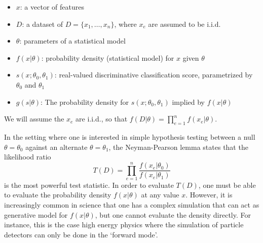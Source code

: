 \documentclass[11pt, oneside]{article}   	%
\begin{document}
\begin{itemize}
 \item $x$: a vector of features
 \item $D$: a dataset of $D=\{x_1, \dots, x_n\}$, where $x_e$ are assumed to be i.i.d.
 \item $\theta$: parameters of a statistical model
\item $f(x| \theta)$:  probability density  (statistical model) for $x$ given $\theta$
\item $s(x;\theta_0, \theta_1)$: real-valued discriminative classification score, parametrized by $\theta_0$ and $\theta_1$
\item $g( s | \theta )$: The probability density  for $s(x; \theta_0, \theta_1)$ implied by $f(x|\theta)$ \end{itemize}
We will assume the $x_e$ are i.i.d., so that $f(D|\theta) = \prod_{e=1}^n f(x_e | \theta)$.

\newpage

In the setting where one is interested in simple hypothesis testing between a null $\theta=\theta_0$ against an alternate $\theta=\theta_1$, the Neyman-Pearson lemma states that the likelihood ratio 
\begin{equation}
T(D) = \prod_{e=1}^n \frac{ f(x_e|\theta_0)}{ f(x_e|\theta_1)}
\end{equation}
is the most powerful test statistic. In order to evaluate $T(D)$, one must be able to evaluate the probability density 
$f(x| \theta)$ at any value $x$. However, it is increasingly common in science that one has a complex simulation that 
can act as generative model  for $f(x|\theta)$, but one cannot evaluate the density directly. For instance, this is the case 
high energy physics where the simulation of particle detectors can only be done in the `forward mode'. 
\end{document}
